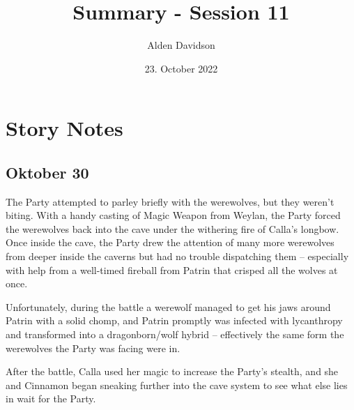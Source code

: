 \documentclass[a4paper,11pt]{article}
\title{Summary - Session 11}
\author{Alden Davidson}
\date{23. October 2022}
\begin{document}
\maketitle

\section{Story Notes}
\subsection{Oktober 30}
The Party attempted to parley briefly with the werewolves, but they weren't biting. With a handy casting of Magic 
Weapon from Weylan, the Party forced the werewolves back into the cave under the withering fire of Calla's longbow.
Once inside the cave, the Party drew the attention of many more werewolves from deeper inside the caverns but had no
trouble dispatching them -- especially with help from a well-timed fireball from Patrin that crisped all the wolves 
at once.

Unfortunately, during the battle a werewolf managed to get his jaws around Patrin with a solid chomp, and Patrin
promptly was infected with lycanthropy and transformed into a dragonborn/wolf hybrid -- effectively the same form 
the werewolves the Party was facing were in.

After the battle, Calla used her magic to increase the Party's stealth, and she and Cinnamon began sneaking further 
into the cave system to see what else lies in wait for the Party.
\end{document}
